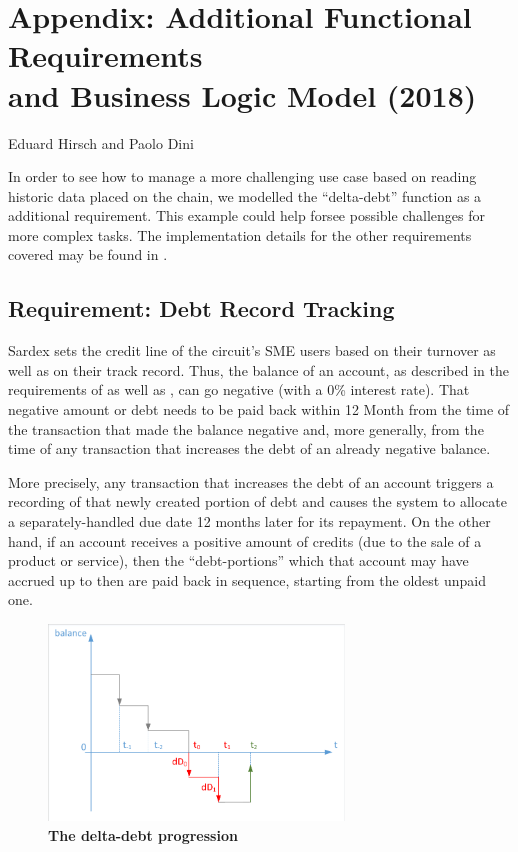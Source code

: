 \chapter*{Appendix: Additional Functional Requirements\\ and Business Logic Model (2018)}
\label{appendix}

\vspace{-1cm}
\begin{center}
Eduard Hirsch and Paolo Dini
\end{center}

In order to see how to manage a more challenging use case based on reading historic data placed on the chain, we modelled the ``delta-debt'' function as a additional requirement. This example could help forsee possible challenges for more complex tasks. The implementation details for the other requirements covered may be found in \cite{INTERLACE_D32}.

\section{Requirement: Debt Record Tracking}

Sardex sets the credit line of the circuit's SME users based on their turnover as well as on their track record. Thus, the balance of an account, as described in the requirements of \cite{INTERLACE_D21} as well as \cite{INTERLACE_D31}, can go negative (with a 0\% interest rate). That negative amount or debt needs to be paid back within 12 Month from the time of the transaction that made the balance negative and, more generally, from the time of any transaction that increases the debt of an already negative balance.

More precisely, any transaction that increases the debt of an account triggers a recording of that newly created portion of debt and causes the system to allocate a separately-handled due date 12 months later for its repayment. On the other hand, if an account receives a positive amount of credits (due to the sale of a product or service), then the ``debt-portions'' which that account may have accrued up to then are paid back in sequence, starting from the oldest unpaid one.

\renewcommand{\thefigure}{A.\arabic{figure}}
\setcounter{figure}{0}

\begin{figure}[htbp]
  \centering
  \includegraphics[width=0.7\textwidth, clip, trim=1mm 1mm 1mm 1mm]{Figures/deltadebt}
  \caption{\bf\small The delta-debt progression}
  \label{fig:debt-graph}
\end{figure}


